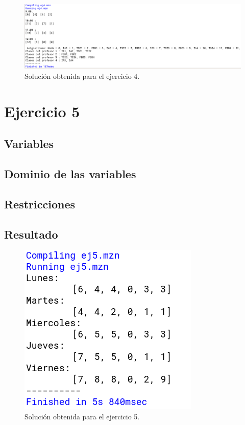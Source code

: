 \documentclass[11pt, spanish]{article}
\begin{document}
\begin{figure}[H]
  \centering
      \includegraphics[scale = 0.30]{sol4.png}
 		 \caption{Solución obtenida para el ejercicio 4.}
  		\label{fig:ej4}

\end{figure}

\section{Ejercicio 5}

\subsection{Variables}

\subsection{Dominio de las variables}

\subsection{Restricciones}

\subsection{Resultado}


\begin{figure}[H]
  \centering
      \includegraphics[scale = 0.30]{sol5.png}
 		 \caption{Solución obtenida para el ejercicio 5.}
  		\label{fig:ej5}

\end{figure}
\end{document}
